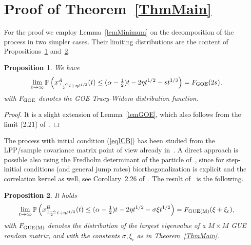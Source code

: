 \documentclass[12pt,a4paper]{article}
\numberwithin{equation}{section}
\newcommand{\Pb}{\mathbb{P}}
\newtheorem{prop}{Proposition}[section]
\begin{document}
\section{Proof of Theorem~\ref{ThmMain}}\label{SectProofMainThm}
For the proof we employ Lemma~\ref{lemMinimum} on the decomposition of the process in two simpler cases. Their limiting distributions are the content of Propositions~\ref{lemGOEextended} and~\ref{prop4.2}.
\begin{prop}\label{lemGOEextended}
We have
\begin{equation}
\lim_{t\to\infty}\Pb\left(x^A_{\frac{1-\alpha}{2}t+\eta t^{1/2}}(t)\leq (\alpha-\tfrac12)t-2\eta t^{1/2}-s t^{1/3}\right)=F_{\rm GOE}(2s),
\end{equation}
with $F_{\rm GOE}$ denotes the GOE Tracy-Widom distribution function.
\end{prop}
\begin{proof}
It is a slight extension of Lemma~\ref{lemGOE}, which also follows from the limit (2.21) of~\cite{BFS07}.
\end{proof}
The process with initial condition (\ref{eqICB}) has been studied from the LPP/sample covariance matrix point of view already in~\cite{BBP06}. A direct approach is possible also using the Fredholm determinant of the particle of~\cite{BF07}, since for step-initial conditions (and general jump rates) biorthogonalization is explicit and the correlation kernel as well, see Corollary~2.26 of~\cite{BF08}. The result of~\cite{BBP06} is the following.
\begin{prop}\label{prop4.2}
It holds
\begin{equation}\label{eq4.2}
\lim_{t\to\infty}\Pb\left(x^B_{\frac{1-\alpha}{2}t+\eta t^{1/2}}(t)\leq (\alpha-\tfrac12)t-2\eta t^{1/2} -\sigma \xi t^{1/2}\right)=F_{\rm GUE(M)}(\xi+\xi_c),
\end{equation}
with $F_{\rm GUE(M)}$ denotes the distribution of the largest eigenvalue of a $M\times M$ GUE random matrix, and with the constants $\sigma,\xi_c$ as in Theorem~\ref{ThmMain}.
\end{prop}
\end{document}
